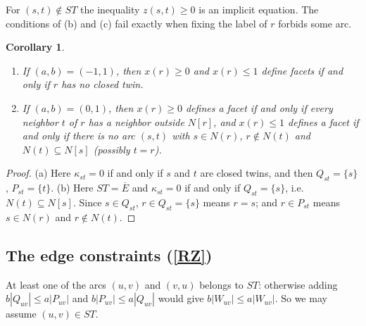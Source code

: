\documentclass[a4paper,11pt]{article}
\newcommand{\ie}{{i.e.~}}
\newcommand{\Eb}{\overline{E}}
\newtheorem{cor}{Corollary}
\theoremstyle{definition}
\begin{document}
For $(s,t) \notin ST$ the inequality $z(s,t) \geq 0$ is an implicit equation. The conditions of (b) and (c) fail exactly when fixing
the label of $r$ forbids some arc.

\begin{cor} \label{CBOUNDS}
\begin{enumerate}
\item[(a)] If $(a,b) = (-1,1)$, then $x(r) \geq 0$ and $x(r) \leq 1$ define facets if and only if $r$ has no closed twin.
\item[(b)] If $(a,b) = (0,1)$, then $x(r) \geq 0$ defines a facet if and only if every neighbor $t$ of $r$ has a neighbor outside $N[r]$,
and $x(r) \leq 1$ defines a facet if and only if there is no arc $(s,t)$ with $s \in N(r)$, $r \notin N(t)$ and $N(t) \subseteq N[s]$
(possibly $t = r$).
\end{enumerate}
\end{cor}
\begin{proof}
(a) Here $\kappa_{st} = 0$ if and only if $s$ and $t$ are closed twins, and then $Q_{st} = \{s\}$, $P_{st} = \{t\}$.
(b) Here $ST = \Eb$ and $\kappa_{st} = 0$ if and only if $Q_{st} = \{s\}$, \ie $N(t) \subseteq N[s]$. Since $s \in Q_{st}$,
$r \in Q_{st} = \{s\}$ means $r = s$; and $r \in P_{st}$ means $s \in N(r)$ and $r \notin N(t)$.
\end{proof}

\subsection{The edge constraints (\ref{RZ})}

At least one of the arcs $(u,v)$ and $(v,u)$ belongs to $ST$: otherwise adding $b|Q_{uv}| \leq a|P_{uv}|$ and $b|P_{uv}| \leq a|Q_{uv}|$
would give $b|W_{uv}| \leq a|W_{uv}|$. So we may assume $(u,v) \in ST$.
\end{document}
